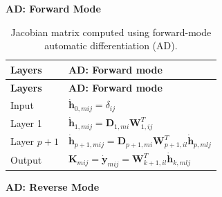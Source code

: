 \documentclass[
  11pt,
  letterpaper,
  DIV=11,
  numbers=noendperiod]{scrreprt}
\begin{document}
\textbf{AD: Forward Mode}

\begin{longtable}[]{@{}
  >{\raggedright\arraybackslash}p{}
  >{\raggedright\arraybackslash}p{}@{}}
\caption{Jacobian matrix computed using forward-mode automatic
differentiation (AD).}\label{tbl-ad-forward}\tabularnewline
\toprule\noalign{}
\begin{minipage}[b]{\linewidth}\raggedright
\textbf{Layers}
\end{minipage} & \begin{minipage}[b]{\linewidth}\raggedright
\textbf{AD: Forward mode}
\end{minipage} \\
\midrule\noalign{}
\endfirsthead
\toprule\noalign{}
\begin{minipage}[b]{\linewidth}\raggedright
\textbf{Layers}
\end{minipage} & \begin{minipage}[b]{\linewidth}\raggedright
\textbf{AD: Forward mode}
\end{minipage} \\
\midrule\noalign{}
\endhead
\bottomrule\noalign{}
\endlastfoot
Input & \(\dot{\mathbf{h}}_{0,mij}=\delta_{ij}\) \\
Layer 1 &
\(\dot{\mathbf{h}}_{1,mij}=\mathbf{D}_{1,mi}\mathbf{W}_{1,ij}^T\) \\
Layer \(p+1\) &
\(\dot{\mathbf{h}}_{p+1,mij}=\mathbf{D}_{p+1,mi}\mathbf{W}_{p+1,il}^T\dot{\mathbf{h}}_{p,mlj}\) \\
Output &
\(\mathbf{K}_{mij}=\dot{\mathbf{y}}_{mij}=\mathbf{W}_{k+1,il}^T\dot{\mathbf{h}}_{k,mlj}\) \\
\end{longtable}

\textbf{AD: Reverse Mode}
\end{document}
